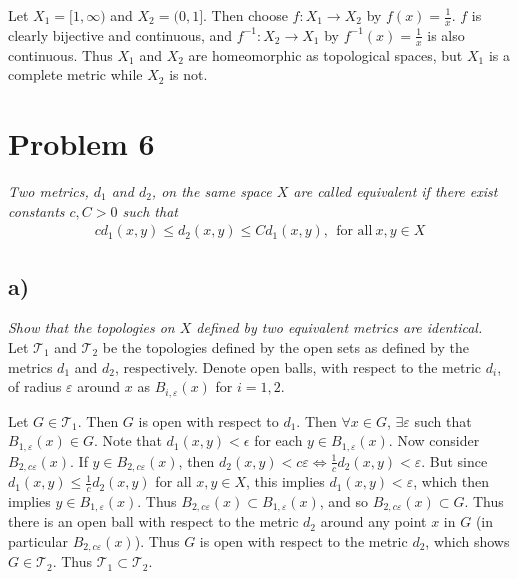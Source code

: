 \documentclass[12pt]{article}
\theoremstyle{plain}
\begin{document}
Let $X_1 = [1,\infty)$ and $X_2 = (0,1]$.  Then choose $f:X_1 \rightarrow X_2$ by $f(x) = \frac{1}{x}$.  $f$ is clearly bijective and continuous, and $f^{-1}:X_2 \rightarrow X_1$ by $f^{-1}(x) = \frac{1}{x}$ is also continuous.  Thus $X_1$ and $X_2$ are homeomorphic as topological spaces, but $X_1$ is a complete metric while $X_2$ is not.

\section*{Problem 6}
\emph{Two metrics, $d_1$ and $d_2$, on the same space $X$ are called equivalent if there exist constants $c, C > 0$ such that}
\begin{align*}
    cd_1(x, y) \leq d_2(x, y) \leq Cd_1(x, y),\ \ \text{for all}\ x,y \in X
\end{align*}
\subsection*{ a)}
\emph{Show that the topologies on $X$ defined by two equivalent metrics are identical.} \\

Let $\mathcal{T}_1$ and $\mathcal{T}_2$ be the topologies defined by the open sets as defined by the metrics $d_1$ and $d_2$, respectively.  Denote open balls, with respect to the metric $d_i$, of radius $\varepsilon$ around $x$ as $B_{i,\varepsilon}(x)$ for $i = 1,2$.

Let $G \in \mathcal{T}_1$.  Then $G$ is open with respect to $d_1$.  Then $\forall x \in G$, $\exists \varepsilon$ such that $B_{1,\varepsilon}(x) \in G$.  Note that $d_1(x,y) < \epsilon$ for each $y \in B_{1,\varepsilon}(x)$.  Now consider $B_{2,c\varepsilon}(x)$.  If $y \in B_{2,c\varepsilon}(x)$, then $d_2(x, y) < c\varepsilon \iff \frac{1}{c}d_2(x, y) < \varepsilon$.  But since $d_1(x,y) \leq \frac{1}{c}d_2(x, y)$ for all $x,y \in X$, this implies $d_1(x, y) < \varepsilon$, which then implies $y \in B_{1, \varepsilon}(x)$.  Thus $B_{2,c\varepsilon}(x) \subset B_{1,\varepsilon}(x)$, and so $B_{2,c\varepsilon}(x) \subset G$.  Thus there is an open ball with respect to the metric $d_2$ around any point $x$ in $G$ (in particular $B_{2,c\varepsilon}(x)$).  Thus $G$ is open with respect to the metric $d_2$, which shows $G \in \mathcal{T}_2$.  Thus $\mathcal{T}_1 \subset \mathcal{T}_2$.
\end{document}

